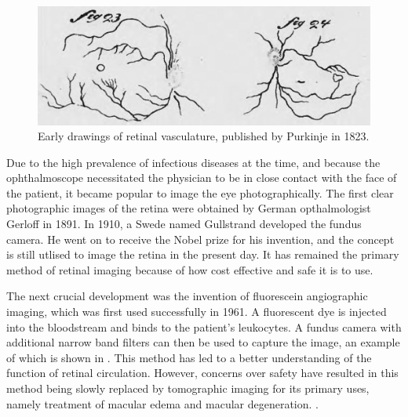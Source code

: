 \begin{figure}[htbp]
\centering
  \includegraphics{figures/retinal_vasc_drawings}
\caption{Early drawings of retinal vasculature, published by Purkinje in 1823.}
\label{fig:retinal_drawings}
\end{figure}


Due to the high prevalence of infectious diseases at the time, and because the ophthalmoscope necessitated the physician to be in close contact with the face of the patient, it became popular to image the eye photographically.  The first clear photographic images of the retina were obtained by German opthalmologist Gerloff in 1891.\cite{gerloffphoto}  In 1910, a Swede named Gullstrand developed the fundus camera.  He went on to receive the Nobel prize for his invention, and the concept is still utlised to image the retina in the present day.\cite{gullstrandcamera}  It has remained the primary method of retinal imaging because of how cost effective and safe it is to use.  

The next crucial development was the invention of fluorescein angiographic imaging, which was first used successfully in 1961.  A fluorescent dye is injected into the bloodstream and binds to the patient's leukocytes.\cite{novotny1961method}  A fundus camera with additional narrow band filters can then be used to capture the image, an example of which is shown in .  This method has led to a better understanding of the function of retinal circulation.  However, concerns over safety have resulted in this method being slowly replaced by tomographic imaging for its primary uses, namely treatment of macular edema and macular degeneration. .


